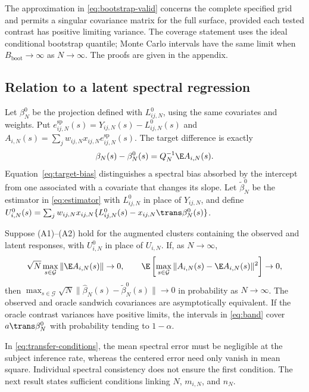 The approximation in \eqref{eq:bootstrap-valid} concerns the complete specified grid and permits a singular covariance matrix for the full surface, provided each tested contrast has positive limiting variance. The coverage statement uses the ideal conditional bootstrap quantile; Monte Carlo intervals have the same limit when $B_{\mathrm{boot}}\to\infty$ as $N\to\infty$. The proofs are given in the appendix.

\subsection{Relation to a latent spectral regression}
Let $\beta_N^0$ be the projection defined with $L^0_{ij,N}$, using the same covariates and weights. Put $e^{\mathrm{sp}}_{ij,N}(s)=Y_{ij,N}(s)-L^0_{ij,N}(s)$ and $A_{i,N}(s)=\sum_jw_{ij,N}x_{ij,N}e^{\mathrm{sp}}_{ij,N}(s)$. The target difference is exactly
\begin{equation}\label{eq:target-bias}
 \beta_N(s)-\beta_N^0(s)=Q_N^{-1}\E A_{i,N}(s).
\end{equation}
Equation~\eqref{eq:target-bias} distinguishes a spectral bias absorbed by the intercept from one associated with a covariate that changes its slope. Let $\widetilde\beta_N^0$ be the estimator in \eqref{eq:estimator} with $L^0_{ij,N}$ in place of $Y_{ij,N}$, and define $U^0_{i,N}(s)=\sum_jw_{ij,N}x_{ij,N}\{L^0_{ij,N}(s)-x_{ij,N}\trans\beta_N^0(s)\}$.

\begin{theorem}\label{thm:transfer}
Suppose (A1)--(A2) hold for the augmented clusters containing the observed and latent responses, with $U^0_{i,N}$ in place of $U_{i,N}$. If, as $N\to\infty$,
\begin{equation}\label{eq:transfer-conditions}
 \sqrt N\max_{s\in\mathcal G}\|\E A_{i,N}(s)\|\to0,
 \qquad
 \E\left[\max_{s\in\mathcal G}
 \|A_{i,N}(s)-\E A_{i,N}(s)\|^2\right]\to0,
\end{equation}
then $\max_{s\in\mathcal G}\sqrt N\|\widehat\beta_N(s)-\widetilde\beta_N^0(s)\|\to0$ in probability as $N\to\infty$. The observed and oracle sandwich covariances are asymptotically equivalent. If the oracle contrast variances have positive limits, the intervals in \eqref{eq:band} cover $a\trans\beta_N^0$ with probability tending to $1-\alpha$.
\end{theorem}

In \eqref{eq:transfer-conditions}, the mean spectral error must be negligible at the subject inference rate, whereas the centered error need only vanish in mean square. Individual spectral consistency does not ensure the first condition. The next result states sufficient conditions linking $N$, $m_{i,N}$, and $n_N$.

